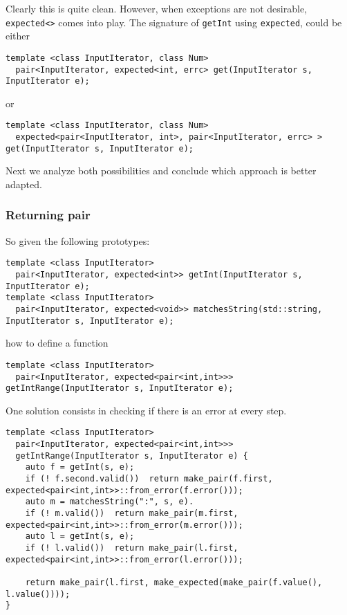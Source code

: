 \documentclass[a4paper,10pt]{article}
\newcommand{\cpp}[1]{\lstinline{#1}}
\begin{document}
Clearly this is quite clean. However, when exceptions are not desirable, \cpp{expected<>} comes into play. 
The signature of \cpp{getInt} using \cpp{expected}, could be either

\begin{lstlisting}
template <class InputIterator, class Num>
  pair<InputIterator, expected<int, errc> get(InputIterator s, InputIterator e);
\end{lstlisting}

or 

\begin{lstlisting}
template <class InputIterator, class Num>
  expected<pair<InputIterator, int>, pair<InputIterator, errc> > get(InputIterator s, InputIterator e);
\end{lstlisting}

Next we analyze both possibilities and conclude which approach is better adapted.

\subsubsection{Returning pair}

So given the following prototypes:

\begin{lstlisting}
template <class InputIterator>
  pair<InputIterator, expected<int>> getInt(InputIterator s, InputIterator e);
template <class InputIterator>
  pair<InputIterator, expected<void>> matchesString(std::string, InputIterator s, InputIterator e);
\end{lstlisting}

\noindent
how to define a function

\begin{lstlisting}
template <class InputIterator>
  pair<InputIterator, expected<pair<int,int>>> getIntRange(InputIterator s, InputIterator e);
\end{lstlisting}


One solution consists in checking if there is an error at every step. 

\begin{lstlisting}
template <class InputIterator>
  pair<InputIterator, expected<pair<int,int>>> 
  getIntRange(InputIterator s, InputIterator e) {
    auto f = getInt(s, e);
    if (! f.second.valid())  return make_pair(f.first, expected<pair<int,int>>::from_error(f.error()));
    auto m = matchesString(":", s, e).
    if (! m.valid())  return make_pair(m.first, expected<pair<int,int>>::from_error(m.error()));
    auto l = getInt(s, e);
    if (! l.valid())  return make_pair(l.first, expected<pair<int,int>>::from_error(l.error()));
        
    return make_pair(l.first, make_expected(make_pair(f.value(), l.value())));
}
\end{lstlisting}
\end{document}
